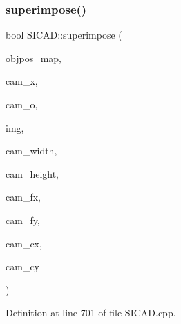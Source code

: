\subsubsection{\texorpdfstring{superimpose()}{superimpose()}\hspace{0.1cm}{\footnotesize\ttfamily [3/8]}}
{\footnotesize\ttfamily bool S\+I\+C\+A\+D\+::superimpose (\begin{DoxyParamCaption}\item[{const \mbox{\hyperlink{classSuperimpose_a178e3d4e2def6635bfcf9454dd4b5d22}{Model\+Pose\+Container}} \&}]{objpos\+\_\+map,  }\item[{const double $\ast$}]{cam\+\_\+x,  }\item[{const double $\ast$}]{cam\+\_\+o,  }\item[{cv\+::\+Mat \&}]{img,  }\item[{const G\+Lsizei}]{cam\+\_\+width,  }\item[{const G\+Lsizei}]{cam\+\_\+height,  }\item[{const G\+Lfloat}]{cam\+\_\+fx,  }\item[{const G\+Lfloat}]{cam\+\_\+fy,  }\item[{const G\+Lfloat}]{cam\+\_\+cx,  }\item[{const G\+Lfloat}]{cam\+\_\+cy }\end{DoxyParamCaption})\hspace{0.3cm}{\ttfamily [virtual]}}



Definition at line 701 of file S\+I\+C\+A\+D.\+cpp.

\mbox{\label{classSICAD_a269e238387393b44177daa4eae88fedd}} 
